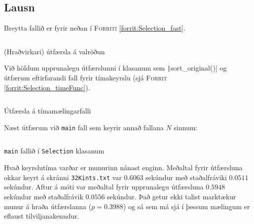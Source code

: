 \documentclass[12pt, a4paper, hidelinks]{article}
\begin{document}
\subsection*{Lausn}
Breytta fallið er fyrir neðan í \textsc{Forriti} \ref{forrit:Selection_fast}.

\begin{listing}[H]
    \centering
    \inputminted[linenos, frame=single, firstline=13, lastline=24, fontsize=\footnotesize]{java}{../src/V2/Selection.java}
    \caption{(Hraðvirkari) útfærsla á valröðun}
    \label{forrit:Selection_fast}
\end{listing}
\noindent
Við höldum upprunalegu útfærslunni í klasanum sem \texttt|sort_original()| og útfærum
eftirfarandi fall fyrir tímakeyrslu (sjá \textsc{Forrit} \ref{forrit:Selection_timeFunc}).

\begin{listing}[H]
    \centering
    \inputminted[firstline=122, lastline=128, frame=single, linenos, fontsize=\footnotesize]{java}{../src/V2/Selection.java}
    \caption{Útfærsla á tímamælingarfalli}
    \label{forrit:Selection_timeFunc}
\end{listing}

\noindent
Næst útfærum við \texttt{main} fall sem keyrir annað fallana $N$ sinnum:
\begin{listing}[H]
    \centering
    \inputminted[firstline=137, lastline=148, fontsize=\footnotesize, frame=single, linenos]{java}{../src/V2/Selection.java}
    \caption{\texttt{main} fallið í \texttt{Selection} klasanum}
\end{listing} 

\noindent
Hvað keyrslutíma varðar er munurinn nánast enginn. Meðaltal fyrir útfærsluna okkar keyrt á skránni \texttt{32Kints.txt} 
var $0.6063$ sekúndur með staðalfráviki $0.0511$ sekúndur. Aftur á móti var meðaltal fyrir upprunalegu útfærsluna $0.5948$
sekúndur með staðalfrávik $0.0556$ sekúndur. Það getur ekki talist marktækur munur á hraða útfærslanna ($p = 0.3988$) og sá sem má sjá í þessum
mælingum er eflaust tilviljanakenndur.

\newpage
\end{document}
